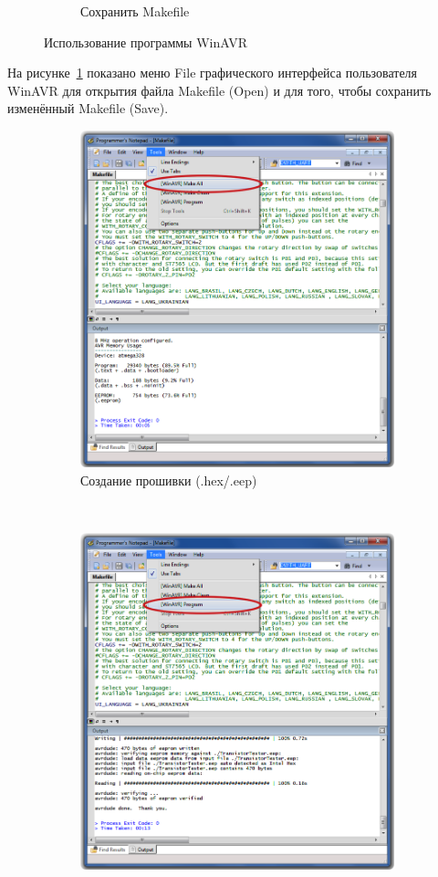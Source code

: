 \begin{figure}[H]
\begin{subfigure}[b]{.5\textwidth}
    \caption{Сохранить Makefile}
  \end{subfigure}
  \caption{Использование программы WinAVR}
  \label{fig:WinAVR1}
\end{figure}
На рисунке~\ref{fig:WinAVR1} показано меню File графического интерфейса пользователя WinAVR для открытия файла 
Makefile (Open) и для того, чтобы сохранить изменённый Makefile (Save).

\begin{figure}[H]
  \begin{subfigure}[b]{.5\textwidth}
    \centering
    \includegraphics[width=.85\textwidth]{../PNG/Notepad_make.png}
    \caption{Создание прошивки (.hex/.eep)}
  \end{subfigure}
  ~
  \begin{subfigure}[b]{.5\textwidth}
    \centering
    \includegraphics[width=.85\textwidth]{../PNG/Notepad_program.png}

\end{subfigure}
\end{figure}
